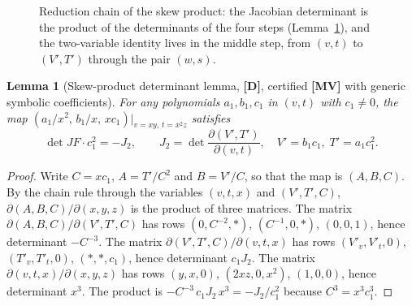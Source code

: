 \documentclass[11pt]{article}
\newtheorem{lemma}[theorem]{Lemma}
\theoremstyle{definition}
\theoremstyle{remark}
\newcommand{\detJ}{\det JF}
\newcommand{\MV}{\textbf{[MV]}}
\newcommand{\DD}{\textbf{[D]}}
\begin{document}
\begin{figure}[t]\centering
{}
\caption{Reduction chain of the skew product: the Jacobian determinant is the product of the determinants of the four steps (Lemma~\ref{lem:skew}), and the two-variable identity lives in the middle step, from $(v,t)$ to $(V',T')$ through the pair $(w,s)$.}
\label{fig:chain}
\end{figure}

\begin{lemma}[Skew-product determinant lemma, {\DD}, certified {\MV} with generic symbolic coefficients]\label{lem:skew}
For \emph{any} polynomials $a_1, b_1, c_1$ in $(v, t)$ with $c_1 \ne 0$, the map
$(a_1/x^2,\, b_1/x,\, x c_1)|_{v = xy,\, t = x^2 z}$ satisfies
\begin{equation}\label{eq:skew}
\detJ \cdot c_1^2 = -J_2, \qquad
J_2 = \det \frac{\partial (V', T')}{\partial (v, t)}, \quad V' = b_1 c_1, \; T' = a_1 c_1^2 .
\end{equation}
\end{lemma}
\begin{proof}
Write $C = x c_1$, $A = T'/C^2$ and $B = V'/C$, so that the map is $(A, B, C)$. By the chain rule through the variables $(v,t,x)$ and $(V',T',C)$,
$\partial(A,B,C)/\partial(x,y,z)$ is the product of three matrices. The matrix $\partial(A,B,C)/\partial(V',T',C)$ has rows $(0, C^{-2}, \ast)$, $(C^{-1}, 0, \ast)$, $(0,0,1)$, hence determinant $-C^{-3}$.
The matrix $\partial(V',T',C)/\partial(v,t,x)$ has rows $(V'_v, V'_t, 0)$, $(T'_v, T'_t, 0)$, $(\ast, \ast, c_1)$, hence determinant $c_1 J_2$. The matrix $\partial(v,t,x)/\partial(x,y,z)$ has rows $(y, x, 0)$, $(2xz, 0, x^2)$, $(1,0,0)$, hence determinant $x^3$.
The product is $-C^{-3}\, c_1 J_2\, x^3 = -J_2/c_1^2$ because $C^3 = x^3c_1^3$.
\end{proof}
\end{document}
